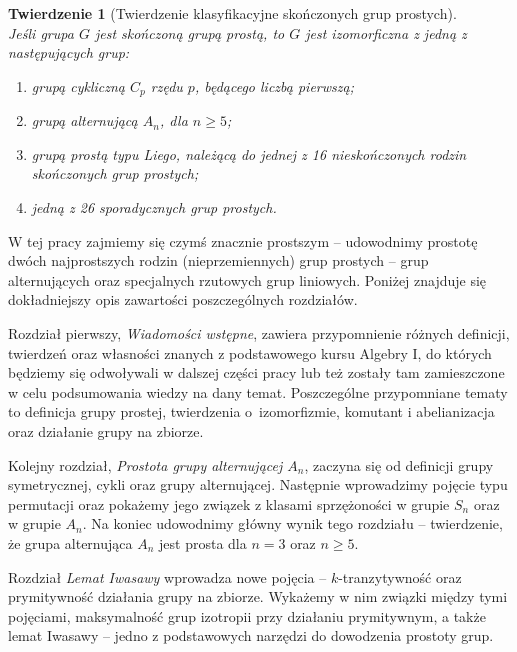 \documentclass[licencjacka]{pracamgr}
\newtheorem*{thh2}{Twierdzenie}
\begin{document}
\begin{thh2}[Twierdzenie klasyfikacyjne skończonych grup prostych] $ $ \\
  Jeśli grupa $G$ jest skończoną grupą prostą, to $G$ jest izomorficzna z jedną z następujących grup:
  \begin{enumerate}
    \item grupą cykliczną $C_p$ rzędu $p$, będącego liczbą pierwszą;
    \item grupą alternującą $A_n$, dla $n \ge 5$;
    \item grupą prostą typu Liego, należącą do jednej z 16 nieskończonych rodzin skończonych grup prostych;
    \item jedną z 26 sporadycznych grup prostych.
  \end{enumerate}
\end{thh2}


W tej pracy zajmiemy się czymś znacznie prostszym -- udowodnimy prostotę dwóch najprostszych rodzin (nieprzemiennych) grup prostych --
grup alternujących oraz specjalnych rzutowych grup liniowych.
Poniżej znajduje się dokładniejszy opis zawartości poszczególnych rozdziałów.

Rozdział pierwszy, \emph{Wiadomości wstępne}, zawiera przypomnienie różnych definicji,
twierdzeń oraz własności znanych z podstawowego kursu Algebry I, do których będziemy się odwoływali
w dalszej części pracy lub też zostały tam zamieszczone w celu podsumowania wiedzy na dany temat.
Poszczególne przypomniane tematy to definicja grupy prostej, twierdzenia o~izomorfizmie,
komutant i abelianizacja oraz działanie grupy na zbiorze.

Kolejny rozdział, \emph{Prostota grupy alternującej $A_n$}, zaczyna się od definicji
grupy symetrycznej, cykli oraz grupy alternującej.
Następnie wprowadzimy pojęcie typu permutacji oraz pokażemy jego związek 
z klasami sprzężoności w grupie $S_n$ oraz w grupie $A_n$.
Na koniec udowodnimy główny wynik tego rozdziału -- twierdzenie, że grupa alternująca $A_n$
jest prosta dla $n = 3$ oraz $n \ge 5$.

Rozdział \emph{Lemat Iwasawy} wprowadza nowe pojęcia -- $k$-tranzytywność oraz prymitywność
działania grupy na zbiorze.
Wykażemy w nim związki między tymi pojęciami, maksymalność grup izotropii przy działaniu prymitywnym,
a także lemat Iwasawy -- jedno z podstawowych narzędzi do dowodzenia prostoty grup.
\end{document}
